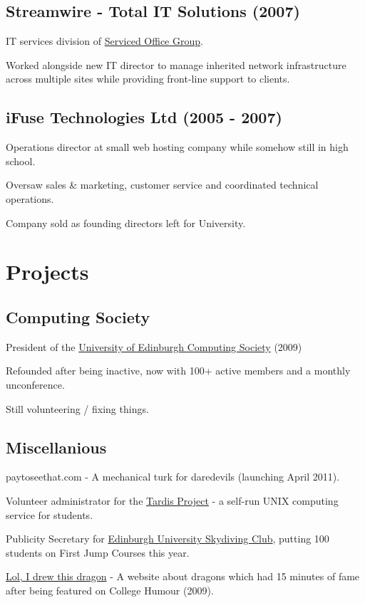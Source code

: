 \documentclass[a4paper]{article}
\renewenvironment{itemize}{
  \begin{list}{}{
    \setlength{\leftmargin}{1.5em}
  }
}{
  \end{list}
}
\begin{document}
\subsection*{Streamwire - Total IT Solutions (2007)}
\begin{itemize}
  \item IT services division of \href{http://servicedofficegroup.com}{Serviced Office Group}.
  \item Worked alongside new IT director to manage inherited network infrastructure across multiple sites while providing front-line support to clients.
\end{itemize}

\subsection*{iFuse Technologies Ltd (2005 - 2007)}
\begin{itemize}
  \item Operations director at small web hosting company while somehow still in high school.
  \item Oversaw sales \& marketing, customer service and coordinated technical operations.
  \item Company sold as founding directors left for University.
\end{itemize}

\section*{Projects}

\subsection*{Computing Society}
\begin{itemize}
\item President of the \href{http://comp-soc.com}{University of Edinburgh Computing Society} (2009)
\item Refounded after being inactive, now with 100+ active members and a monthly unconference.
\item Still volunteering / fixing things.
\end{itemize}

\subsection*{Miscellanious}
\begin{itemize}
\item paytoseethat.com - A mechanical turk for daredevils (launching April 2011).
\item Volunteer administrator for the \href{http://www.tardis.ed.ac.uk/}{Tardis Project} - a self-run UNIX computing service for students.
\item Publicity Secretary for \href{http://facebook.com/getjumped/}{Edinburgh University Skydiving Club}, putting 100 students on First Jump Courses this year.
\item \href{http://lolidrewthisdragon.com}{Lol, I drew this dragon} - A website about dragons which had 15 minutes of fame after being featured on College Humour (2009).
\end{itemize}
\end{document}
